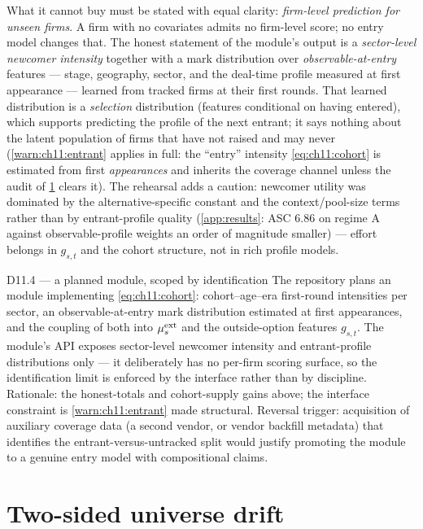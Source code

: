 What it cannot buy must be stated with equal clarity: \emph{firm-level
prediction for unseen firms}. A firm with no covariates admits no
firm-level score; no entry model changes that. The honest statement of
the module's output is a \emph{sector-level newcomer intensity} together
with a mark distribution over \emph{observable-at-entry} features ---
stage, geography, sector, and the deal-time profile measured at first
appearance --- learned from tracked firms at their first rounds. That
learned distribution is a \emph{selection} distribution (features
conditional on having entered), which supports predicting the profile of
the next entrant; it says nothing about the latent population of firms
that have not raised and may never (\cref{warn:ch11:entrant} applies in
full: the ``entry'' intensity \cref{eq:ch11:cohort} is estimated from
first \emph{appearances} and inherits the coverage channel unless the
audit of \cref{ch11:sec:drift} clears it). The rehearsal adds a
caution: newcomer utility was dominated by the alternative-specific
constant and the context/pool-size terms rather than by entrant-profile
quality (\cref{app:results}: ASC $6.86$ on regime A against
observable-profile weights an order of magnitude smaller) --- effort
belongs in $g_{s,t}$ and the cohort structure, not in rich profile
models.

\begin{decision}{D11.4 --- a planned  module, scoped by identification}
The repository plans an  module implementing
\cref{eq:ch11:cohort}: cohort--age--era first-round intensities per
sector, an observable-at-entry mark distribution estimated at first
appearances, and the coupling of both into
$\mu_s^{\mathrm{ext}}$ and the outside-option features $g_{s,t}$. The
module's API exposes sector-level newcomer intensity and entrant-profile
distributions only --- it deliberately has no per-firm scoring surface,
so the identification limit is enforced by the interface rather than by
discipline. Rationale: the honest-totals and cohort-supply gains above;
the interface constraint is \cref{warn:ch11:entrant} made structural.
Reversal trigger: acquisition of auxiliary coverage data (a second
vendor, or vendor backfill metadata) that identifies the
entrant-versus-untracked split would justify promoting the module to a
genuine entry model with compositional claims.
\end{decision}

\section{Two-sided universe drift}\label{ch11:sec:drift}

